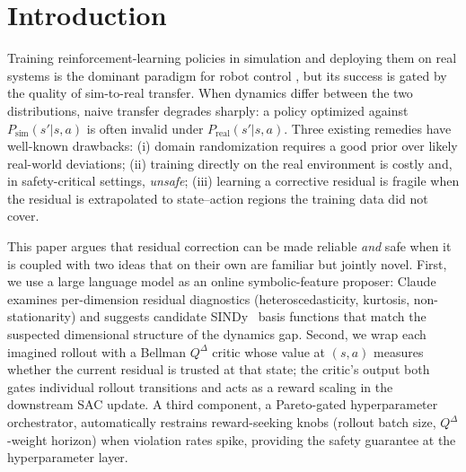 \documentclass{article}
\theoremstyle{definition}
\newcommand{\Psim}{P_{\mathrm{sim}}}
\newcommand{\Preal}{P_{\mathrm{real}}}
\newcommand{\QD}{Q^{\Delta}}
\begin{document}
\section{Introduction}
\label{sec:intro}

Training reinforcement-learning policies in simulation and deploying them
on real systems is the dominant paradigm for robot control
\cite{tobin2017,rma2021,drake-sim2real}, but its success is gated by the
quality of sim-to-real transfer.  When dynamics differ between the two
distributions, naive transfer degrades sharply: a policy optimized against
$\Psim(s'|s,a)$ is often invalid under $\Preal(s'|s,a)$.  Three existing
remedies have well-known drawbacks: (i) domain randomization
\cite{tobin2017,peng2018} requires a good prior over likely real-world
deviations; (ii) training directly on the real environment
\cite{rlpd2023,h2oplus} is costly and, in safety-critical settings,
\emph{unsafe}; (iii) learning a corrective residual
\cite{darc2020,rma2021} is fragile when the residual is extrapolated to
state--action regions the training data did not cover.

This paper argues that residual correction can be made reliable \emph{and}
safe when it is coupled with two ideas that on their own are familiar but
jointly novel.  First, we use a large language model as an online
symbolic-feature proposer: Claude examines per-dimension residual
diagnostics (heteroscedasticity, kurtosis, non-stationarity) and suggests
candidate SINDy~\cite{sindy2016} basis functions that match the suspected
dimensional structure of the dynamics gap.  Second, we wrap each imagined
rollout with a Bellman $\QD$ critic whose value at $(s,a)$ measures
whether the current residual is trusted at that state; the critic's output
both gates individual rollout transitions and acts as a reward scaling in
the downstream SAC update.  A third component, a Pareto-gated
hyperparameter orchestrator, automatically restrains reward-seeking knobs
(rollout batch size, $\QD$-weight horizon) when violation rates spike,
providing the safety guarantee at the hyperparameter layer.
\end{document}
